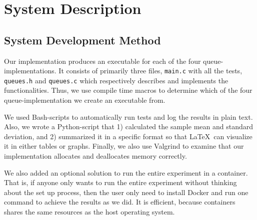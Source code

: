 \documentclass[a4paper,11pt]{kth-mag}
\newcommand*{\skippara}{\par\vspace{\baselineskip} \noindent}
\begin{document}


\chapter{System Description}


\section{System Development Method}
Our implementation produces an executable for each of the four queue-implementations.
It consists of primarily three files, \texttt{main.c} with all the tests, \texttt{queues.h} and \texttt{queues.c} which respectively describes and implements the functionalities.
Thus, we use compile time macros to determine which of the four queue-implementation we create an executable from.

\skippara We used Bash-scripts to automatically run tests and log the results in plain text.
Also, we wrote a Python-script that 1) calculated the sample mean and standard deviation, and 2) summarized it in a specific format so that \LaTeX \  can visualize it in either tables or graphs.
Finally, we also use Valgrind to examine that our implementation allocates and deallocates memory correctly.

\skippara We also added an optional solution to run the entire experiment in a container.
That is, if anyone only wants to run the entire experiment without thinking about the set up process, then the user only need to install Docker and run one command to achieve the results as we did.
It is efficient, because containers shares the same resources as the host operating system.
\end{document}
